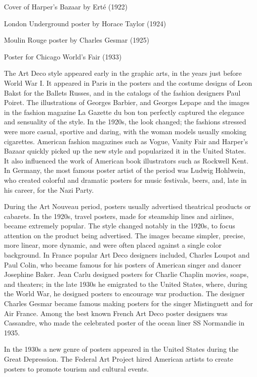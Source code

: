 Cover of Harper's Bazaar by Erté (1922)

London Underground poster by Horace Taylor (1924)

Moulin Rouge poster by Charles Gesmar (1925)

Poster for Chicago World's Fair (1933)

The Art Deco style appeared early in the graphic arts, in the years just
before World War I. It appeared in Paris in the posters and the costume
designs of Leon Bakst for the Ballets Russes, and in the catalogs of the
fashion designers Paul Poiret. The illustrations of Georges Barbier, and
Georges Lepape and the images in the fashion magazine La Gazette du bon
ton perfectly captured the elegance and sensuality of the style. In the
1920s, the look changed; the fashions stressed were more casual,
sportive and daring, with the woman models usually smoking cigarettes.
American fashion magazines such as Vogue, Vanity Fair and Harper's
Bazaar quickly picked up the new style and popularized it in the United
States. It also influenced the work of American book illustrators such
as Rockwell Kent. In Germany, the most famous poster artist of the
period was Ludwig Hohlwein, who created colorful and dramatic posters
for music festivals, beers, and, late in his career, for the Nazi Party.

During the Art Nouveau period, posters usually advertised theatrical
products or cabarets. In the 1920s, travel posters, made for steamship
lines and airlines, became extremely popular. The style changed notably
in the 1920s, to focus attention on the product being advertised. The
images became simpler, precise, more linear, more dynamic, and were
often placed against a single color background. In France popular Art
Deco designers included, Charles Loupot and Paul Colin, who became
famous for his posters of American singer and dancer Josephine Baker.
Jean Carlu designed posters for Charlie Chaplin movies, soaps, and
theaters; in the late 1930s he emigrated to the United States, where,
during the World War, he designed posters to encourage war production.
The designer Charles Gesmar became famous making posters for the singer
Mistinguett and for Air France. Among the best known French Art Deco
poster designers was Cassandre, who made the celebrated poster of the
ocean liner SS Normandie in 1935.

In the 1930s a new genre of posters appeared in the United States during
the Great Depression. The Federal Art Project hired American artists to
create posters to promote tourism and cultural events.

